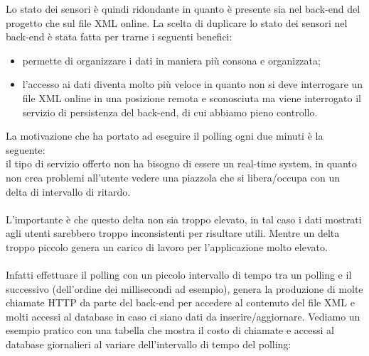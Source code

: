 Lo stato dei sensori è quindi ridondante in quanto è presente sia nel \gls{back-end} del progetto che sul file \gls{XML} online. 
La scelta di duplicare lo stato dei sensori nel \gls{back-end} è stata fatta per trarne i seguenti benefici:
\begin{itemize}
    \item permette di organizzare i dati in maniera più consona e organizzata;
    \item l'accesso ai dati diventa molto più veloce in quanto non si deve interrogare un file \gls{XML} online
        in una posizione remota e sconosciuta ma viene interrogato il servizio di persistenza del \gls{back-end}, 
        di cui abbiamo pieno controllo.
\end{itemize}
\leavevmode\newline
La motivazione che ha portato ad eseguire il polling ogni due minuti è la seguente:
\\
il tipo di servizio offerto non ha bisogno di essere un \gls{real-time system}\glsfirstoccur, in quanto non crea problemi all'utente
vedere una piazzola che si libera/occupa con un delta di intervallo di ritardo. 
\\\\
L'importante è che questo delta non sia troppo elevato, in tal caso i dati mostrati agli utenti sarebbero troppo
inconsistenti per risultare utili. Mentre un delta troppo piccolo genera un carico di lavoro per l'applicazione molto
elevato.
\\\\
Infatti effettuare il polling con un piccolo intervallo di tempo tra un polling e il successivo (dell'ordine dei millisecondi
ad esempio),
genera la produzione di molte 
chiamate \gls{HTTP} da parte del \gls{back-end} per accedere al contenuto del file \gls{XML} e molti accessi al database in caso ci siano dati da 
inserire/aggiornare.
\clearpage
\leavevmode\newline
Vediamo un esempio pratico con una tabella che mostra il costo di chiamate e accessi al database giornalieri al variare 
dell'intervallo di tempo del polling:

